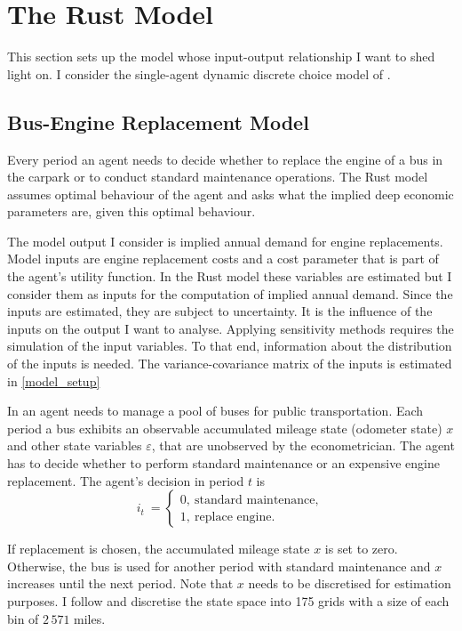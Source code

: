 \section{The Rust Model} \label{rust_model}

This section sets up the model whose input-output relationship I want to shed light on. I consider the single-agent dynamic discrete choice model of \citet{R87}.

\subsection{Bus-Engine Replacement Model}

Every period an agent needs to decide whether to replace the engine of a bus in the carpark or to conduct standard maintenance operations. The Rust model assumes optimal behaviour of the agent and asks what the implied deep economic parameters are, given this optimal behaviour.

The model output I consider is implied annual demand for engine replacements. Model inputs are engine replacement costs and a cost parameter that is part of the agent’s utility function. In the Rust model these variables are estimated but I consider them as inputs for the computation of implied annual demand. Since the inputs are estimated, they are subject to uncertainty. It is the influence of the inputs on the output I want to analyse. Applying sensitivity methods requires the simulation of the input variables. To that end, information about the distribution of the inputs is needed. The variance-covariance matrix of the inputs is estimated in \cref{model_setup} %

In \citet{R87} an agent needs to manage a pool of buses for public transportation. Each period a bus exhibits an observable accumulated mileage state (odometer state) $x$ and other state variables $\varepsilon$, that are unobserved by the econometrician. The agent has to decide whether to perform standard maintenance or an expensive engine replacement. The agent’s decision in period $t$ is
\begin{equation*}
i_t\ =
\begin{cases}
0,\ \text{standard maintenance}, \\
1,\ \text{replace engine}.
\end{cases}
\end{equation*}

\noindent If replacement is chosen, the accumulated mileage state $x$ is set to zero. Otherwise, the bus is used for another period with standard maintenance and $x$ increases until the next period. Note that $x$ needs to be discretised for estimation purposes. I follow \citet{R87} and discretise the state space into 175 grids with a size of each bin of $2\,571$ miles.

